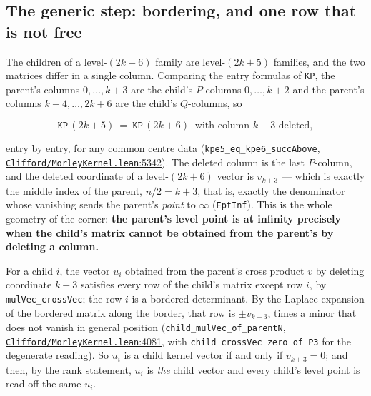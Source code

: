 \documentclass[11pt]{article}
\theoremstyle{definition}
\theoremstyle{remark}
\begin{document}
\hypertarget{the-generic-step-bordering-and-one-row-that-is-not-free}{%
\subsection{The generic step: bordering, and one row that is not free}\label{the-generic-step-bordering-and-one-row-that-is-not-free}}

The children of a level-\((2k+6)\) family are level-\((2k+5)\) families, and the two matrices differ in a
single column. Comparing the entry formulas of \texttt{KP}, the parent's columns \(0, \dots, k+3\) are the child's
\(P\)-columns \(0, \dots, k+2\) and the parent's columns \(k+4, \dots, 2k+6\) are the child's \(Q\)-columns, so

\[ \texttt{KP}\,(2k+5)\ =\ \texttt{KP}\,(2k+6)\ \text{ with column } k+3 \text{ deleted}, \]

entry by entry, for any common centre data (\texttt{kpe5\_\allowbreak eq\_\allowbreak kpe6\_\allowbreak succAbove},
\href{https://github.com/jpbald93/paperl_clifford_chain/blob/e1ae145c2565cc98816635387412edc0a740c27c/Clifford/MorleyKernel.lean\#L5342}{\texttt{Clifford/\allowbreak MorleyKernel.lean}:5342}). The deleted column is the last \(P\)-column, and the deleted
coordinate of a level-\((2k+6)\) vector is \(v_{k+3}\) --- which is exactly the middle index of the parent,
\(n/2 = k+3\), that is, exactly the denominator whose vanishing sends the parent's \emph{point} to $\infty$
(\texttt{EptInf}). This is the whole geometry of the corner: \textbf{the parent's level point is at infinity precisely
when the child's matrix cannot be obtained from the parent's by deleting a column.}

For a child \(i\), the vector \(u_i\) obtained from the parent's cross product \(v\) by deleting coordinate
\(k+3\) satisfies every row of the child's matrix except row \(i\), by \texttt{mulVec\_\allowbreak crossVec}; the row \(i\) is a
bordered determinant. By the Laplace expansion of the bordered matrix along the border, that row is
\(\pm v_{k+3}\), times a minor that does not vanish in general position
(\texttt{child\_\allowbreak mulVec\_\allowbreak of\_\allowbreak parentN}, \href{https://github.com/jpbald93/paperl_clifford_chain/blob/e1ae145c2565cc98816635387412edc0a740c27c/Clifford/MorleyKernel.lean\#L4081}{\texttt{Clifford/\allowbreak MorleyKernel.lean}:4081}, with \texttt{child\_\allowbreak crossVec\_\allowbreak zero\_\allowbreak of\_\allowbreak P3} for the
degenerate reading). So \(u_i\) is a child kernel vector if and only if \(v_{k+3} = 0\); and then, by the rank
statement, \(u_i\) is \emph{the} child vector and every child's level point is read off the same \(u_i\).
\end{document}
